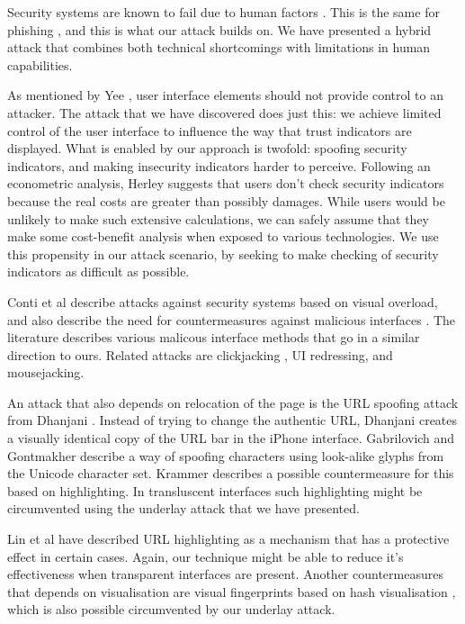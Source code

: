 \documentclass[twoside,letterpaper]{soups}
\begin{document}
Security systems are known to fail due to human factors \cite{fail}. This is the same for phishing \cite{Dhamija:2006:WPW:1124772.1124861}, and this is what our attack builds on. We have presented a hybrid attack that combines both technical shortcomings with limitations in human capabilities.

As mentioned by Yee \cite{yee2005guidelines}, user interface elements should not provide control to an attacker. The attack that we have discovered does just this: we achieve limited control of the user interface to influence the way that trust indicators are displayed. What is enabled by our approach is twofold: spoofing security indicators, and making insecurity indicators harder to perceive. Following an econometric analysis, Herley \cite{externalities} suggests that users don't check security indicators because the real costs are greater than possibly damages. While users would be unlikely to make such extensive calculations, we can safely assume that they make some cost-benefit analysis when exposed to various technologies. We use this propensity in our attack scenario, by seeking to make checking of security indicators as difficult as possible.

Conti et al \cite{overload} describe attacks against security systems based on visual overload, and also describe the need for countermeasures against malicious interfaces \cite{conti2010malicious}. The literature describes various malicous interface methods that go in a similar direction to ours. Related attacks are clickjacking \cite{huang2012clickjacking}, UI redressing, and mousejacking.

An attack that also depends on relocation of the page is the URL spoofing attack from Dhanjani \cite{iphone}. Instead of trying to change the authentic URL, Dhanjani creates a visually identical copy of the URL bar in the iPhone interface. Gabrilovich and Gontmakher \cite{gabrilovich2002homograph} describe a way of spoofing characters using look-alike glyphs from the Unicode character set. Krammer \cite{Krammer:2006:PDA:1501434.1501473} describes a possible countermeasure for this based on highlighting. In transluscent interfaces such highlighting might be circumvented using the underlay attack that we have presented.

Lin et al \cite{lin2007} have described URL highlighting as a mechanism that has a protective effect in certain cases. Again, our technique might be able to reduce it's effectiveness when transparent interfaces are present. Another countermeasures that depends on visualisation are visual fingerprints \cite{dhamija2005battle} based on hash visualisation \cite{visualisation}, which is also possible circumvented by our underlay attack.
\end{document}
